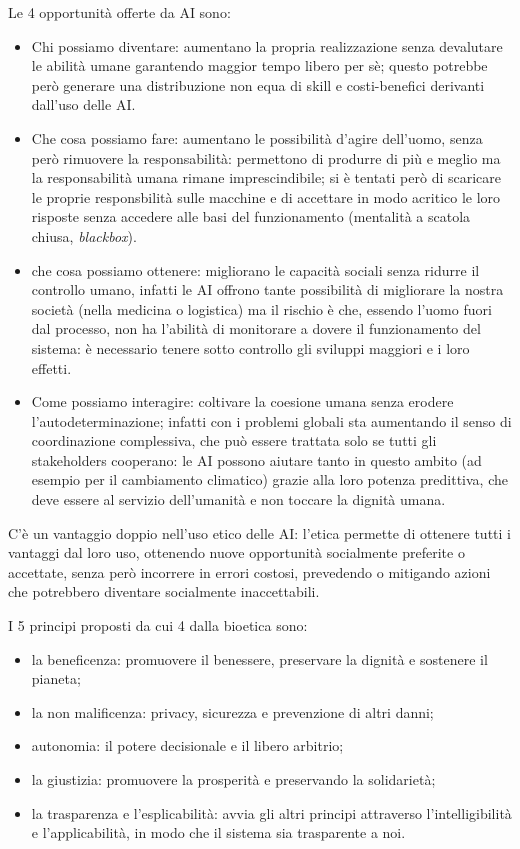 \documentclass[a4page, 11pt]{article}
\begin{document}
Le 4 opportunità offerte da AI sono:
\begin{itemize}
  \item Chi possiamo diventare: aumentano la propria realizzazione senza devalutare le abilità umane garantendo maggior tempo libero per sè; questo potrebbe però generare una distribuzione non equa di skill e costi-benefici derivanti dall'uso delle AI.
  \item Che cosa possiamo fare: aumentano le possibilità d'agire dell'uomo, senza però rimuovere la responsabilità: permettono di produrre di più e meglio ma la responsabilità umana rimane imprescindibile; si è tentati però di scaricare le proprie responsbilità sulle macchine e di accettare in modo acritico le loro risposte senza accedere alle basi del funzionamento (mentalità a scatola chiusa, \textit{blackbox}).
  \item che cosa possiamo ottenere: migliorano le capacità sociali senza ridurre il controllo umano, infatti le AI offrono tante possibilità di migliorare la nostra società (nella medicina o logistica) ma il rischio è che, essendo l'uomo fuori dal processo, non ha l'abilità di monitorare a dovere il funzionamento del sistema: è necessario tenere sotto controllo gli sviluppi maggiori e i loro effetti.
  \item Come possiamo interagire: coltivare la coesione umana senza erodere l'autodeterminazione; infatti con i problemi globali sta aumentando il senso di coordinazione complessiva, che può essere trattata solo se tutti gli stakeholders cooperano: le AI possono aiutare tanto in questo ambito (ad esempio per il cambiamento climatico) grazie alla loro potenza predittiva, che deve essere al servizio dell'umanità e non toccare la dignità umana.
\end{itemize}

C'è un vantaggio doppio nell'uso etico delle AI: l'etica permette di ottenere tutti i vantaggi dal loro uso, ottenendo nuove opportunità socialmente preferite o accettate, senza però incorrere in errori costosi, prevedendo o mitigando azioni che potrebbero diventare socialmente inaccettabili.

I 5 principi proposti da cui 4 dalla bioetica sono:
\begin{itemize}
  \item la beneficenza: promuovere il benessere, preservare la dignità e sostenere il pianeta;
  \item la non malificenza: privacy, sicurezza e prevenzione di altri danni;
  \item autonomia: il potere decisionale e il libero arbitrio;
  \item la giustizia: promuovere la prosperità e preservando la solidarietà;
  \item la trasparenza e l'esplicabilità: avvia gli altri principi attraverso l'intelligibilità e l'applicabilità, in modo che il sistema sia trasparente a noi.
\end{itemize}
\end{document}
